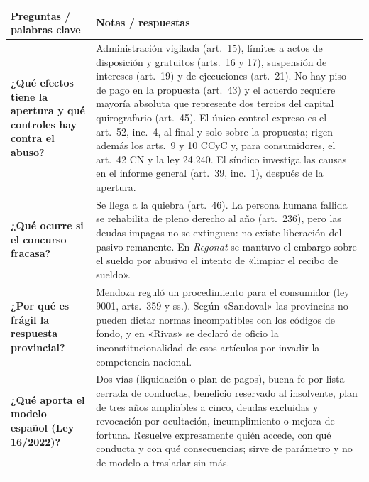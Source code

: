 \documentclass[12pt,oneside]{book}
\makeatletter
\newcommand{\cornellresumen}[1]{%
  \midrule
  \multicolumn{2}{@{}p{\dimexpr0.92\textwidth+2\tabcolsep+\arrayrulewidth\relax}@{}}{%
    \textbf{Resumen:} #1} \\
}
\newenvironment{cornell}{%
  \renewcommand{\arraystretch}{1.2}%
  \begin{longtable}{@{}>{\raggedright\arraybackslash}p{0.27\textwidth}|>{\raggedright\arraybackslash}p{0.65\textwidth}@{}}
  \toprule
  \textbf{Preguntas / palabras clave} & \textbf{Notas / respuestas} \\
  \midrule
  \endhead
}{%
  \bottomrule
  \end{longtable}%
}
\makeatother
\begin{document}
\begin{cornell}
\textbf{¿Qué efectos tiene la apertura y qué controles hay contra el abuso?} &
Administración vigilada (art.~15), límites a actos de disposición y gratuitos (arts.~16 y 17), suspensión de intereses (art.~19) y de ejecuciones (art.~21). No hay piso de pago en la propuesta (art.~43) y el acuerdo requiere mayoría absoluta que represente dos tercios del capital quirografario (art.~45). El único control expreso es el art.~52, inc.~4, al final y solo sobre la propuesta; rigen además los arts.~9 y 10 CCyC y, para consumidores, el art.~42 CN y la ley 24.240. El síndico investiga las causas en el informe general (art.~39, inc.~1), después de la apertura. \\
\addlinespace

\textbf{¿Qué ocurre si el concurso fracasa?} &
Se llega a la quiebra (art.~46). La persona humana fallida se rehabilita de pleno derecho al año (art.~236), pero las deudas impagas no se extinguen: no existe liberación del pasivo remanente. En \textit{Regonat} se mantuvo el embargo sobre el sueldo por abusivo el intento de «limpiar el recibo de sueldo». \\
\addlinespace

\textbf{¿Por qué es frágil la respuesta provincial?} &
Mendoza reguló un procedimiento para el consumidor (ley 9001, arts.~359 y ss.). Según «Sandoval» las provincias no pueden dictar normas incompatibles con los códigos de fondo, y en «Rivas» se declaró de oficio la inconstitucionalidad de esos artículos por invadir la competencia nacional. \\
\addlinespace

\textbf{¿Qué aporta el modelo español (Ley 16/2022)?} &
Dos vías (liquidación o plan de pagos), buena fe por lista cerrada de conductas, beneficio reservado al insolvente, plan de tres años ampliables a cinco, deudas excluidas y revocación por ocultación, incumplimiento o mejora de fortuna. Resuelve expresamente quién accede, con qué conducta y con qué consecuencias; sirve de parámetro y no de modelo a trasladar sin más. \\
\cornellresumen{El régimen de la LCQ declara concursable a toda persona humana y exige cesación de pagos, pero el acceso se traba por requisitos contables (art.~11), costos de edictos (art.~30) y un pequeño concurso definido por tamaño. El control del abuso es tardío (art.~52, inc.~4), la quiebra no libera el remanente (art.~236), la vía provincial es frágil y el modelo español ofrece un parámetro de comparación.}
\end{cornell}
\end{document}
